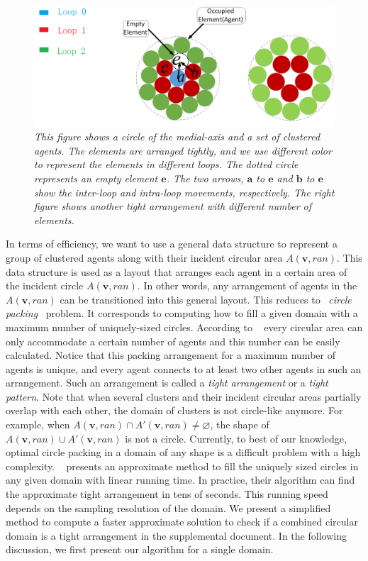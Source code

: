 \begin{figure}[t]
\centering
\includegraphics[width=0.7\linewidth]{figs/Fullload}
\caption{\em This figure shows a circle of the medial-axis and a set of clustered agents. The elements are arranged tightly, and we use different color to represent the elements in different loops. The dotted circle represents an empty element $\mathbf{e}$. 
The two arrows, $\mathbf{a}$ to $\mathbf{e}$ and $\mathbf{b}$ to $\mathbf{e}$ show the inter-loop and intra-loop movements, respectively. The right figure shows another tight arrangement with different number of elements.}
\vspace*{-0.15in}
\label{fig:circular}
\end{figure}

In terms of efficiency, we want to use a general data structure to represent a group of clustered agents along with their incident circular area $A(\mathbf v,ran)$.
This data structure is used as a layout that arranges each agent in a certain area of the incident circle $A(\mathbf v,ran)$. In other words, any arrangement of agents in the $A(\mathbf v,ran)$ can be transitioned into this general layout. This reduces to ~\emph{circle packing}~\cite{graham1998dense} problem. It corresponds to computing how to fill a given domain with a maximum number of uniquely-sized circles.  According to ~\cite{graham1998dense} every circular area can only accommodate a certain number of agents and this number can be easily calculated. Notice that this packing arrangement for a maximum number of agents is unique, and every agent connects to at least two other agents in such an arrangement. Such an arrangement is called a \emph{tight arrangement} or a \emph{tight pattern}.
Note that when several clusters and their incident circular areas partially overlap with each other, the domain of clusters is not circle-like anymore. For example, when $ A(\mathbf v,ran) \cap A'(\mathbf v,ran) \neq \varnothing$, the shape of $ A(\mathbf v,ran) \cup A'(\mathbf v,ran)$ is not a circle.
Currently, to best of our knowledge, optimal circle packing in a domain of any shape is a difficult problem with a high complexity. ~\cite{galiev2013linear} presents an approximate method to fill the uniquely sized circles in any given domain with linear running time. In practice, their algorithm can find the approximate tight arrangement in tens of seconds. This running speed depends on the sampling resolution of the domain. We present a simplified method to compute a faster approximate solution to check if a combined circular domain is a tight arrangement in the supplemental document. In the following discussion, we first present our algorithm for a single domain.

